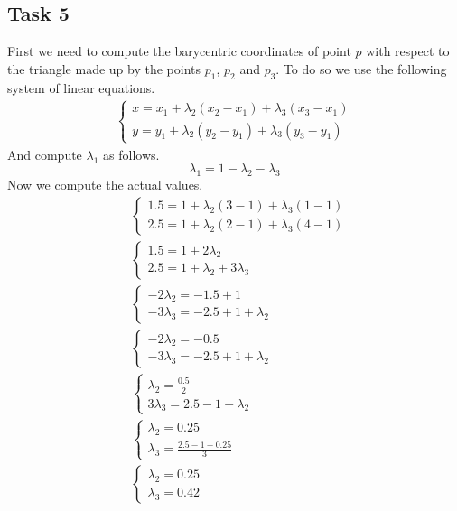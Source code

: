 \documentclass{article}
\begin{document}
\subsection{Task 5}
First we need to compute the barycentric coordinates of point $p$ with respect to the triangle made up by the points $p_1$, $p_2$ and $p_3$. To do so we use the following system of linear equations.
\begin{align*}
	\begin{cases} x = x_1 + \lambda_2 (x_2-x_1) + \lambda_3 (x_3-x_1) \\ y = y_1 + \lambda_2 (y_2-y_1) + \lambda_3 (y_3-y_1) \end{cases}
\end{align*}
And compute $\lambda_1$ as follows.
\[ \lambda_1 = 1 - \lambda_2 - \lambda_3 \]
Now we compute the actual values.
\begin{align*}
	& \begin{cases} 1.5 = 1 + \lambda_2(3-1) + \lambda_3(1-1) \\ 2.5 = 1 + \lambda_2(2-1) + \lambda_3(4-1) \end{cases} \\ 
	& \begin{cases} 1.5 = 1+2 \lambda_2 \\ 2.5 = 1 + \lambda_2 + 3 \lambda_3 \end{cases} \\ 
	& \begin{cases} -2\lambda_2 = -1.5+1 \\ -3\lambda_3 = -2.5+1+\lambda_2 \end{cases} \\
	& \begin{cases} -2\lambda_2 = -0.5 \\ -3\lambda_3 = -2.5+1+\lambda_2 \end{cases} \\
	& \begin{cases} \lambda_2 = \displaystyle \frac{0.5}{2} \\ 3\lambda_3 = 2.5-1-\lambda_2 \end{cases} \\
	& \begin{cases} \lambda_2 = 0.25 \\ \lambda_3 = \displaystyle \frac{2.5 - 1 - 0.25}{3}  \end{cases} \\
	& \begin{cases} \lambda_2 = 0.25 \\ \lambda_3 = 0.42 \end{cases}
\end{align*}
\end{document}
